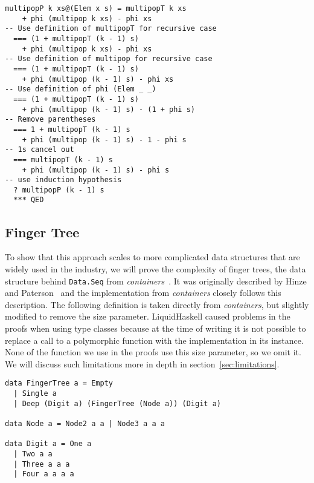 \documentclass[sigplan,screen]{acmart}
\begin{document}
\begin{lstlisting}
multipopP k xs@(Elem x s) = multipopT k xs
    + phi (multipop k xs) - phi xs
-- Use definition of multipopT for recursive case
  === (1 + multipopT (k - 1) s)
    + phi (multipop k xs) - phi xs
-- Use definition of multipop for recursive case
  === (1 + multipopT (k - 1) s)
    + phi (multipop (k - 1) s) - phi xs
-- Use definition of phi (Elem _ _)
  === (1 + multipopT (k - 1) s)
    + phi (multipop (k - 1) s) - (1 + phi s)
-- Remove parentheses
  === 1 + multipopT (k - 1) s
    + phi (multipop (k - 1) s) - 1 - phi s
-- 1s cancel out
  === multipopT (k - 1) s
    + phi (multipop (k - 1) s) - phi s
-- use induction hypothesis
  ? multipopP (k - 1) s
  *** QED
\end{lstlisting}

\subsection{Finger Tree}\label{sec:fingertree}

To show that this approach scales to more complicated data structures that are widely used in the industry, we will prove the complexity of finger trees, the data structure behind \texttt{Data.Seq} from \textit{containers}~\cite{containers}. It was originally described by Hinze and Paterson~\cite{fingertrees} and the implementation from \textit{containers} closely follows this description. The following definition is taken directly from \textit{containers}, but slightly modified to remove the size parameter. LiquidHaskell caused problems in the proofs when using type classes because at the time of writing it is not possible to replace a call to a polymorphic function with the implementation in its instance. None of the function we use in the proofs use this size parameter, so we omit it. We will discuss such limitations more in depth in section~\ref{sec:limitations}.

\begin{lstlisting}
data FingerTree a = Empty
  | Single a
  | Deep (Digit a) (FingerTree (Node a)) (Digit a)

data Node a = Node2 a a | Node3 a a a

data Digit a = One a
  | Two a a
  | Three a a a
  | Four a a a a
\end{lstlisting}
\end{document}
